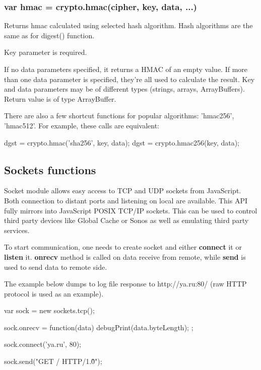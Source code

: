 \subsubsection{var hmac = crypto.hmac(cipher, key, data, ...)}
Returns hmac calculated using selected hash algorithm. Hash algorithms are the same as 
for digest() function.

Key parameter is required. 

If no data parameters specified, it returns a HMAC of an empty value. If more than one 
data parameter is specified, they're all used to calculate the result. Key and data 
parameters may be of different types (strings, arrays, ArrayBuffers).
Return value is of type ArrayBuffer.

There are also a few shortcut functions for popular algorithms: 'hmac256', 'hmac512'. For 
example, these calls are equivalent:

\begin{listingverbatim}
  dgst = crypto.hmac('sha256', key, data);
  dgst = crypto.hmac256(key, data);
\end{listingverbatim}

\subsection{Sockets functions}

Socket module allows easy access to TCP and UDP sockets from JavaScript.
Both connection to distant ports and listening on local are available. This API fully 
mirrors into JavaScript POSIX TCP/IP sockets.
This can be used to control third party devices like Global Cache or Sonos
as well as emulating third party services.

To start communication, one needs to create socket and either
\textbf{connect} it or \textbf{listen} it. \textbf{onrecv} method is called
on data receive from remote, while \textbf{send} is used to send data to remote side.

The example below dumps to log file response to http://ya.ru:80/ (raw HTTP
protocol is used as an example).

\begin{listingverbatim}
var sock = new sockets.tcp();

sock.onrecv = function(data) {
    debugPrint(data.byteLength);
};

sock.connect('ya.ru', 80);

sock.send("GET / HTTP/1.0\r\n\r\n");
\end{listingverbatim}

